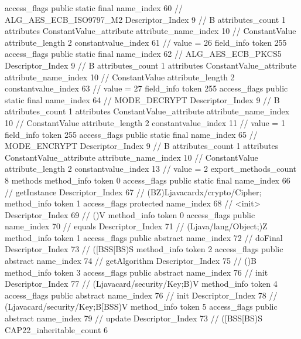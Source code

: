 {{{{{				access_flags	public static final
				name_index	60		// ALG_AES_ECB_ISO9797_M2
				Descriptor_Index	9		// B
				attributes_count	1
				attributes {
				ConstantValue_attribute {
					attribute_name_index	10		// ConstantValue
					attribute_length	2
					constantvalue_index	61		// value = 26
				}
				}
			}
			field_info {
				token	255
				access_flags	public static final
				name_index	62		// ALG_AES_ECB_PKCS5
				Descriptor_Index	9		// B
				attributes_count	1
				attributes {
				ConstantValue_attribute {
					attribute_name_index	10		// ConstantValue
					attribute_length	2
					constantvalue_index	63		// value = 27
				}
				}
			}
			field_info {
				token	255
				access_flags	public static final
				name_index	64		// MODE_DECRYPT
				Descriptor_Index	9		// B
				attributes_count	1
				attributes {
				ConstantValue_attribute {
					attribute_name_index	10		// ConstantValue
					attribute_length	2
					constantvalue_index	11		// value = 1
				}
				}
			}
			field_info {
				token	255
				access_flags	public static final
				name_index	65		// MODE_ENCRYPT
				Descriptor_Index	9		// B
				attributes_count	1
				attributes {
				ConstantValue_attribute {
					attribute_name_index	10		// ConstantValue
					attribute_length	2
					constantvalue_index	13		// value = 2
				}
				}
			}
			}
			export_methods_count	8
			methods {
				method_info {
					token	0
					access_flags	public static final
					name_index	66		// getInstance
					Descriptor_Index	67		// (BZ)Ljavacardx/crypto/Cipher;
				}
				method_info {
					token	1
					access_flags	protected
					name_index	68		// <init>
					Descriptor_Index	69		// ()V
				}
				method_info {
					token	0
					access_flags	public
					name_index	70		// equals
					Descriptor_Index	71		// (Ljava/lang/Object;)Z
				}
				method_info {
					token	1
					access_flags	public abstract
					name_index	72		// doFinal
					Descriptor_Index	73		// ([BSS[BS)S
				}
				method_info {
					token	2
					access_flags	public abstract
					name_index	74		// getAlgorithm
					Descriptor_Index	75		// ()B
				}
				method_info {
					token	3
					access_flags	public abstract
					name_index	76		// init
					Descriptor_Index	77		// (Ljavacard/security/Key;B)V
				}
				method_info {
					token	4
					access_flags	public abstract
					name_index	76		// init
					Descriptor_Index	78		// (Ljavacard/security/Key;B[BSS)V
				}
				method_info {
					token	5
					access_flags	public abstract
					name_index	79		// update
					Descriptor_Index	73		// ([BSS[BS)S
				}
			}
			CAP22_inheritable_count	6
		}
	}
}

